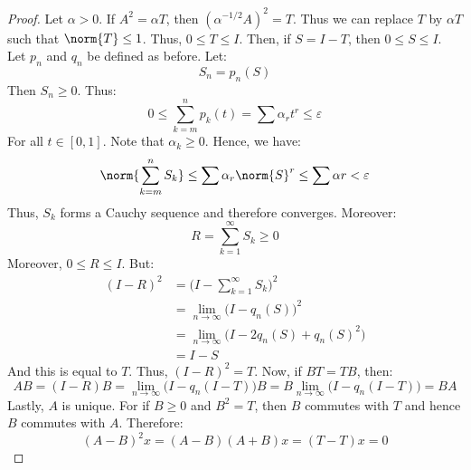     \begin{proof}
        Let $\alpha>0$. If $A^{2}=\alpha{T}$, then
        $(\alpha^{\minus{1}/2}A)^{2}=T$. Thus we can replace
        $T$ by $\alpha{T}$ such that $\norm{T}\leq{1}$.
        Thus, $0\leq{T}\leq{I}$. Then, if $S=I-T$, then
        $0\leq{S}\leq{I}$. Let $p_{n}$ and $q_{n}$ be
        defined as before. Let:
        \begin{equation}
            S_{n}=p_{n}(S)
        \end{equation}
        Then $S_{n}\geq{0}$. Thus:
        \begin{equation}
            0\leq\sum_{k=m}^{n}p_{k}(t)=
            \sum\alpha_{r}t^{r}\leq\varepsilon
        \end{equation}
        For all $t\in[0,1]$. Note that $\alpha_{k}\geq{0}$.
        Hence, we have:
        \begin{equation}
            \norm{\sum_{k=m}^{n}S_{k}}
            \leq\sum\alpha_{r}\norm{S}^{r}\leq
            \sum\alpha{r}<\varepsilon
        \end{equation}
        Thus, $S_{k}$ forms a Cauchy sequence and therefore
        converges. Moreover:
        \begin{equation}
            R=\sum_{k=1}^{\infty}S_{k}\geq{0}
        \end{equation}
        Moreover, $0\leq{R}\leq{I}$. But:
        \begin{align}
            (I-R)^{2}
            &=\Big(I-\sum_{k=1}^{\infty}S_{k}\Big)^{2}\\
            &=\underset{n\rightarrow\infty}{\lim}
                \big(I-q_{n}(S)\big)^{2}\\
            &=\underset{n\rightarrow\infty}{\lim}
                \big(I-2q_{n}(S)+q_{n}(S)^{2}\big)\\
            &=I-S
        \end{align}
        And this is equal to $T$. Thus, $(I-R)^{2}=T$.
        Now, if $BT=TB$, then:
        \begin{equation}
            AB=(I-R)B
            =\underset{n\rightarrow\infty}{\lim}
                \big(I-q_{n}(I-T)\big)B
            =B\underset{n\rightarrow\infty}{\lim}
                \big(I-q_{n}(I-T)\big)
            =BA
        \end{equation}
        Lastly, $A$ is unique. For if $B\geq{0}$ and
        $B^{2}=T$, then $B$ commutes with $T$ and hence
        $B$ commutes with $A$. Therefore:
        \begin{equation}
            (A-B)^{2}x=(A-B)(A+B)x=(T-T)x=0

\end{equation}
\end{proof}
